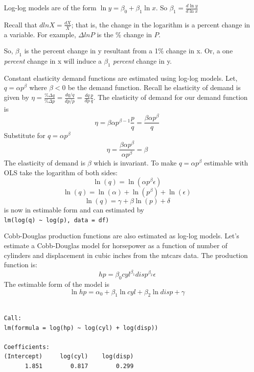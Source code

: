 \documentclass[]{book}
\newenvironment{Shaded}{\begin{snugshade}}{\end{snugshade}}
\newcommand{\KeywordTok}[1]{\textcolor[rgb]{0.13,0.29,0.53}{\textbf{#1}}}
\newcommand{\NormalTok}[1]{#1}
\newcommand{\OperatorTok}[1]{\textcolor[rgb]{0.81,0.36,0.00}{\textbf{#1}}}
\newcommand{\StringTok}[1]{\textcolor[rgb]{0.31,0.60,0.02}{#1}}
\begin{document}
Log-log models are of the form \(\ln y = \beta_0 + \beta_1\ln x\). So \(\beta_1 = \frac{d\ln y}{d\ln x}\)

Recall that \(dlnX=\frac{dX}{X}\); that is, the change in the logarithm is a percent change in a variable. For example, \(\Delta lnP\) is the \% change in \(P\).

So, \(\beta_1\) is the percent change in y resultant from a 1\% change in x. Or, a one \emph{percent} change in x will induce a \(\beta_1\) \emph{percent} change in y.

Constant elasticity demand functions are estimated using log-log models. Let, \(q=\alpha p^\beta\) where \(\beta<0\) be the demand function. Recall he elasticity of demand is given by \(\eta=\frac{\%\Delta q}{\%\Delta p} = \frac{dq/q}{dp/p}=\frac{dq}{dp}\frac{p}{q}\). The elasticity of demand for our demand function is \[\eta=\beta\alpha p^{\beta-1}\frac{p}{q}=\frac{\beta\alpha p^{\beta}}{q}\] Substitute for \(q=\alpha p^\beta\) \[\eta=\frac{\beta\alpha p^{\beta}}{\alpha p^\beta}=\beta\] The elasticity of demand is \(\beta\) which is invariant. To make \(q=\alpha p^\beta\) estimable with OLS take the logarithm of both sides: \[\ln(q)=\ln(\alpha p^\beta\epsilon)\] \[\ln(q)=\ln(\alpha)+\ln( p^\beta)+\ln(\epsilon)\] \[\ln(q)=\gamma+\beta\ln(p) + \delta\] is now in estimable form and can estimated by \texttt{lm(log(q)\ \textasciitilde{}\ log(p),\ data\ =\ df)}

Cobb-Douglas production functions are also estimated as log-log models. Let's estimate a Cobb-Douglas model for horsepower as a function of number of cylinders and displacement in cubic inches from the mtcars data. The production function is: \[hp=\beta_0cyl^{\beta_1}disp^{\beta_2}\epsilon\] The estimable form of the model is \[\ln hp=\alpha_0+\beta_1\ln cyl+\beta_2\ln disp+\gamma\]

\begin{Shaded}
\end{Shaded}

\begin{verbatim}

Call:
lm(formula = log(hp) ~ log(cyl) + log(disp))

Coefficients:
(Intercept)     log(cyl)    log(disp)  
      1.851        0.817        0.299  
\end{verbatim}
\end{document}
